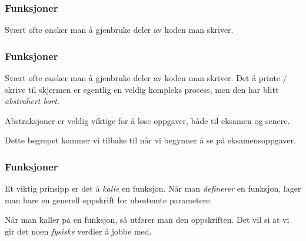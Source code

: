 
\begin{frame}
    \frametitle{Funksjoner}

    Svært ofte ønsker man å gjenbruke deler av koden man skriver. 

\end{frame}


\begin{frame}
    \frametitle{Funksjoner}

    Svært ofte ønsker man å gjenbruke deler av koden man skriver. Det å printe / skrive til skjermen er egentlig en veldig kompleks prosess, men den har blitt \textit{abstrahert bort}. 
    
    Abstraksjoner er veldig viktige for å løse oppgaver, både til eksamen og senere. 

    Dette begrepet kommer vi tilbake til når vi begynner å se på eksamensoppgaver. 

\end{frame}

\begin{frame}
    \frametitle{Funksjoner}

    Et viktig prinsipp er det å \textit{kalle} en funksjon. Når man \textit{definerer} en funksjon, lager man bare en generell oppskrift for ubestemte parametere. 
    
    Når man kaller på en funksjon, så utfører man den oppskriften. Det vil si at vi gir det noen \textit{fysiske} verdier å jobbe med. 

\end{frame}

